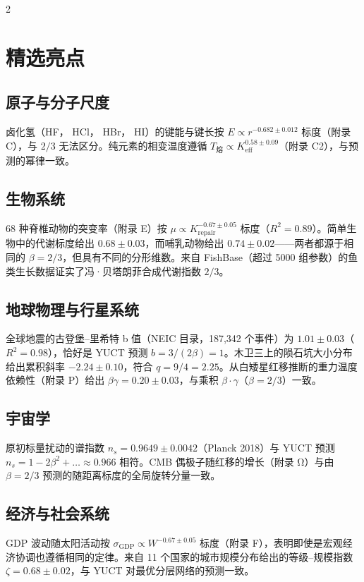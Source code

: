 \documentclass[11pt,a4paper]{article}
\newcommand{\betaf}{\beta}
\begin{document}
\begin{multicols}{2}
		\section{精选亮点}
		
		\subsection{原子与分子尺度}
		卤化氢（HF， HCl， HBr， HI）的键能与键长按 \(E \propto r^{-0.682\pm0.012}\) 标度（附录 C），与 \(2/3\) 无法区分。纯元素的相变温度遵循 \(T_{\text{熔}} \propto K_{\mathrm{eff}}^{0.58\pm0.09}\)（附录 C2），与预测的幂律一致。
		
		\subsection{生物系统}
		68 种脊椎动物的突变率（附录 E）按 \(\mu \propto K_{\mathrm{repair}}^{-0.67\pm0.05}\) 标度（\(R^2=0.89\)）。简单生物中的代谢标度给出 \(0.68\pm0.03\)，而哺乳动物给出 \(0.74\pm0.02\)——两者都源于相同的 \(\betaf = 2/3\)，但具有不同的分形维数。来自 FishBase（超过 5000 组参数）的鱼类生长数据证实了冯·贝塔朗菲合成代谢指数 \(2/3\)。
		
		\subsection{地球物理与行星系统}
		全球地震的古登堡–里希特 b 值（NEIC 目录，187,342 个事件）为 \(1.01\pm0.03\)（\(R^2=0.98\)），恰好是 YUCT 预测 \(b = 3/(2\betaf) = 1\)。木卫三上的陨石坑大小分布给出累积斜率 \(-2.24\pm0.10\)，符合 \(q = 9/4 = 2.25\)。从白矮星红移推断的重力温度依赖性（附录 P）给出 \(\beta\gamma = 0.20 \pm 0.03\)，与乘积 \(\betaf \cdot \gamma\)（\(\betaf = 2/3\)）一致。
		
		\subsection{宇宙学}
		原初标量扰动的谱指数 \(n_s = 0.9649\pm0.0042\)（Planck 2018）与 YUCT 预测 \(n_s = 1 - 2\betaf^2 + \dots \approx 0.966\) 相符。CMB 偶极子随红移的增长（附录 Ω）与由 \(\betaf = 2/3\) 预测的随距离标度的全局旋转分量一致。
		
		\subsection{经济与社会系统}
		GDP 波动随太阳活动按 \(\sigma_{\text{GDP}} \propto W^{-0.67\pm0.05}\) 标度（附录 F），表明即使是宏观经济协调也遵循相同的定律。来自 11 个国家的城市规模分布给出的等级–规模指数 \(\zeta = 0.68\pm0.02\)，与 YUCT 对最优分层网络的预测一致。
		

\end{multicols}
\end{document}
